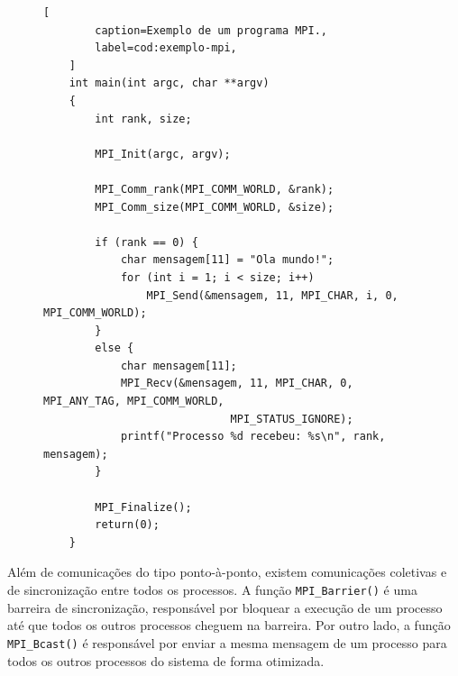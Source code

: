 \begin{figure}[t]
	\begin{lstlisting}[
		caption=Exemplo de um programa MPI.,
		label=cod:exemplo-mpi,
	]
	int main(int argc, char **argv)
	{
		int rank, size;

		MPI_Init(argc, argv);

		MPI_Comm_rank(MPI_COMM_WORLD, &rank);
		MPI_Comm_size(MPI_COMM_WORLD, &size);

		if (rank == 0) {
			char mensagem[11] = "Ola mundo!";
			for (int i = 1; i < size; i++)
				MPI_Send(&mensagem, 11, MPI_CHAR, i, 0, MPI_COMM_WORLD);
		}
		else {
			char mensagem[11];
			MPI_Recv(&mensagem, 11, MPI_CHAR, 0, MPI_ANY_TAG, MPI_COMM_WORLD,
							 MPI_STATUS_IGNORE);
			printf("Processo %d recebeu: %s\n", rank, mensagem);
		}

		MPI_Finalize();
		return(0);
	}
	\end{lstlisting}
\end{figure}

Além de comunicações do tipo ponto-à-ponto, existem comunicações coletivas e de sincronização entre
todos os processos. A função \texttt{MPI\_Barrier()} é uma barreira de sincronização, responsável por bloquear a
execução de um processo até que todos os outros processos cheguem na barreira.
Por outro lado, a função \texttt{MPI\_Bcast()} é responsável por enviar a mesma
mensagem de um processo para todos os outros processos do sistema de forma otimizada.

%
%
%
%
%
%


